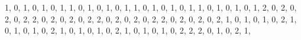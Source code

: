 \documentclass[
  12pt,
]{krantz}
\newenvironment{Shaded}{\begin{snugshade}}{\end{snugshade}}
\newcommand{\DecValTok}[1]{\textcolor[rgb]{0.00,0.00,0.81}{#1}}
\newcommand{\NormalTok}[1]{#1}
\begin{document}
\begin{Shaded}
\begin{Highlighting}[]
                \DecValTok{1}\NormalTok{, }\DecValTok{0}\NormalTok{, }\DecValTok{1}\NormalTok{, }\DecValTok{0}\NormalTok{, }\DecValTok{1}\NormalTok{, }\DecValTok{0}\NormalTok{, }\DecValTok{1}\NormalTok{,}
                \DecValTok{1}\NormalTok{, }\DecValTok{0}\NormalTok{, }\DecValTok{1}\NormalTok{, }\DecValTok{0}\NormalTok{, }\DecValTok{1}\NormalTok{, }\DecValTok{0}\NormalTok{, }\DecValTok{1}\NormalTok{,}
                \DecValTok{1}\NormalTok{, }\DecValTok{0}\NormalTok{, }\DecValTok{1}\NormalTok{, }\DecValTok{0}\NormalTok{, }\DecValTok{1}\NormalTok{, }\DecValTok{0}\NormalTok{, }\DecValTok{1}\NormalTok{,}
                \DecValTok{1}\NormalTok{, }\DecValTok{0}\NormalTok{, }\DecValTok{1}\NormalTok{, }\DecValTok{0}\NormalTok{, }\DecValTok{1}\NormalTok{, }\DecValTok{0}\NormalTok{, }\DecValTok{1}\NormalTok{,}
                \DecValTok{2}\NormalTok{, }\DecValTok{0}\NormalTok{, }\DecValTok{2}\NormalTok{, }\DecValTok{0}\NormalTok{, }\DecValTok{2}\NormalTok{, }\DecValTok{0}\NormalTok{, }\DecValTok{2}\NormalTok{,}
                \DecValTok{2}\NormalTok{, }\DecValTok{0}\NormalTok{, }\DecValTok{2}\NormalTok{, }\DecValTok{0}\NormalTok{, }\DecValTok{2}\NormalTok{, }\DecValTok{0}\NormalTok{, }\DecValTok{2}\NormalTok{,}
                \DecValTok{2}\NormalTok{, }\DecValTok{0}\NormalTok{, }\DecValTok{2}\NormalTok{, }\DecValTok{0}\NormalTok{, }\DecValTok{2}\NormalTok{, }\DecValTok{0}\NormalTok{, }\DecValTok{2}\NormalTok{,}
                \DecValTok{2}\NormalTok{, }\DecValTok{0}\NormalTok{, }\DecValTok{2}\NormalTok{, }\DecValTok{0}\NormalTok{, }\DecValTok{2}\NormalTok{, }\DecValTok{0}\NormalTok{, }\DecValTok{2}\NormalTok{,}
                \DecValTok{1}\NormalTok{, }\DecValTok{0}\NormalTok{, }\DecValTok{1}\NormalTok{, }\DecValTok{0}\NormalTok{, }\DecValTok{1}\NormalTok{, }\DecValTok{0}\NormalTok{, }\DecValTok{2}\NormalTok{,}
                \DecValTok{1}\NormalTok{, }\DecValTok{0}\NormalTok{, }\DecValTok{1}\NormalTok{, }\DecValTok{0}\NormalTok{, }\DecValTok{1}\NormalTok{, }\DecValTok{0}\NormalTok{, }\DecValTok{2}\NormalTok{,}
                \DecValTok{1}\NormalTok{, }\DecValTok{0}\NormalTok{, }\DecValTok{1}\NormalTok{, }\DecValTok{0}\NormalTok{, }\DecValTok{1}\NormalTok{, }\DecValTok{0}\NormalTok{, }\DecValTok{2}\NormalTok{,}
                \DecValTok{1}\NormalTok{, }\DecValTok{0}\NormalTok{, }\DecValTok{1}\NormalTok{, }\DecValTok{0}\NormalTok{, }\DecValTok{1}\NormalTok{, }\DecValTok{0}\NormalTok{, }\DecValTok{2}\NormalTok{,}
                \DecValTok{2}\NormalTok{, }\DecValTok{2}\NormalTok{, }\DecValTok{0}\NormalTok{, }\DecValTok{1}\NormalTok{, }\DecValTok{0}\NormalTok{, }\DecValTok{2}\NormalTok{, }\DecValTok{1}\NormalTok{,}

\end{Highlighting}
\end{Shaded}
\end{document}
